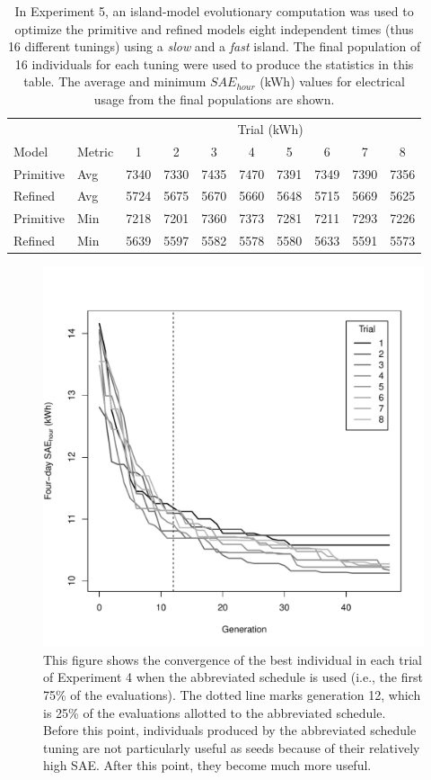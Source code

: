 \documentclass[preprint, review, 12pt]{elsarticle}
\begin{document}
{\begin{table}[htbp]
\centering
\caption{In Experiment 5, an island-model evolutionary computation was used to optimize the primitive and refined models eight independent times (thus 16 different tunings) using a \emph{slow} and a \emph{fast} island. The final population of 16 individuals for each tuning were used to produce the statistics in this table. The average and minimum $SAE_{hour}$ (kWh) values for electrical usage from the final populations are shown.}
\label{tab:hourly-parallel}
\begin{tabular}{llcccccccc}
\toprule
 &  & \multicolumn{8}{c}{Trial (kWh)}\\
Model & Metric & 1 & 2 & 3 & 4 & 5 & 6 & 7 & 8\\
\midrule
Primitive & Avg & 7340 & 7330 & 7435 & 7470 & 7391 & 7349 & 7390 & 7356\\\rowcolor{DarkRow}
Refined   & Avg & 5724 & 5675 & 5670 & 5660 & 5648 & 5715 & 5669 & 5625\\
Primitive & Min & 7218 & 7201 & 7360 & 7373 & 7281 & 7211 & 7293 & 7226\\\rowcolor{DarkRow}
Refined   & Min & 5639 & 5597 & 5582 & 5578 & 5580 & 5633 & 5591 & 5573\\
\bottomrule
\end{tabular}
\end{table}

\begin{figure}[htbp]
\centering
\includegraphics[width=5in]{figure2}
\caption{This figure shows the convergence of the best individual in each trial of Experiment 4 when the abbreviated schedule is used (i.e., the first 75\% of the evaluations). The dotted line marks generation 12, which is 25\% of the evaluations allotted to the abbreviated schedule. Before this point, individuals produced by the abbreviated schedule tuning are not particularly useful as seeds because of their relatively high SAE. After this point, they become much more useful.}
\label{fig:hour-converge}
\end{figure}


}
\end{document}
